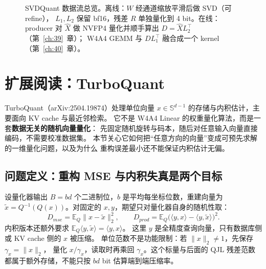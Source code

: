 \begin{figure}[H]
\caption{SVDQuant 数据流总览。离线：$W$ 经通道缩放平滑后做 SVD（可 refine），
$L_1,L_2$ 保留 bf16，残差 $R$ 单独量化到 4 bit。在线：producer 对 $\widehat X$
做 NVFP4 量化并顺手算出 $D=\widehat XL_2^{\top}$（第~\ref{ch:39}~章）；
W4A4 GEMM 与 $DL_1^{\top}$ 融合成一个 kernel（第~\ref{ch:40}~章）。}
\label{fig:38-svdq-flow}
\end{figure}

\section{扩展阅读：TurboQuant}\label{sec:38-turbo}

TurboQuant（arXiv:2504.19874）处理单位向量
$x\in\mathbb S^{d-1}$ 的存储与内积估计，主要面向 KV cache 与最近邻检索。
它不是 W4A4 Linear 的权重量化算法，而是一套\textbf{数据无关的随机向量量化}：
先固定随机旋转与码本，随后对任意输入向量直接编码，不需要校准数据集。
本节关心它如何把“任意方向的向量”变成可预先求解的一维量化问题，以及为什么
重构误差最小还不能保证内积估计无偏。

\subsection{问题定义：重构 MSE 与内积失真是两个目标}

设量化器输出 $B=bd$ 个二进制位，$b$ 是平均每坐标位数，重建向量为
$\widetilde x=Q^{-1}(Q(x))$。对固定的 $x,y$，期望只对量化器自身的随机性取：
\begin{equation}
  D_{mse}=\mathbb E_Q\|x-\widetilde x\|_2^2,\qquad
  D_{prod}=\mathbb E_Q\bigl(\langle y,x\rangle-
  \langle y,\widetilde x\rangle\bigr)^2.
  \label{eq:38-tq-objectives}
\end{equation}
内积版本还额外要求
$\mathbb E_Q\langle y,\widetilde x\rangle=\langle y,x\rangle$。
这里 $y$ 是全精度查询向量，只有数据库侧或 KV cache 侧的 $x$ 被压缩。
单位范数不是功能限制：若 $\|x\|_2\ne1$，先保存 $\gamma_x=\|x\|_2$，
量化 $x/\gamma_x$，读取时再乘回 $\gamma_x$。这个标量与后面的 QJL 残差范数
都属于额外存储，不能只按 $bd$ bit 估算端到端压缩率。

